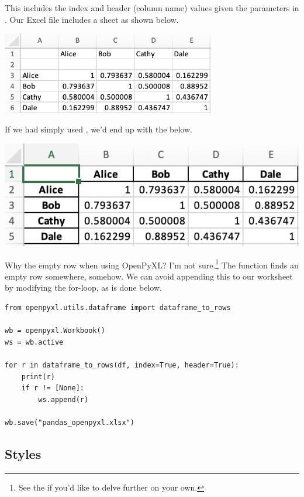 This includes the index and header (column name) values given the parameters in . Our Excel file includes a sheet as shown below. 

\begin{center}
    \includegraphics[width = 0.7\textwidth]{images/excel_ss1.png}
\end{center}

\noindent If we had simply used , we'd end up with the below. 

\begin{center}
    \includegraphics[width = .7\textwidth]{images/excel_pandas_save.png}
\end{center}

\noindent Why the empty row when using OpenPyXL? I'm not sure.\footnote{See the  if you'd like to delve further on your own.} The  function finds an empty row somewhere, somehow. We can avoid appending this to our worksheet by modifying the for-loop, as is done below. 

\begin{lstlisting}[label = {lst:wb}]
from openpyxl.utils.dataframe import dataframe_to_rows

wb = openpyxl.Workbook()
ws = wb.active

for r in dataframe_to_rows(df, index=True, header=True):
    print(r)
    if r != [None]:
        ws.append(r)

wb.save("pandas_openpyxl.xlsx")
\end{lstlisting}


\subsection{Styles}

